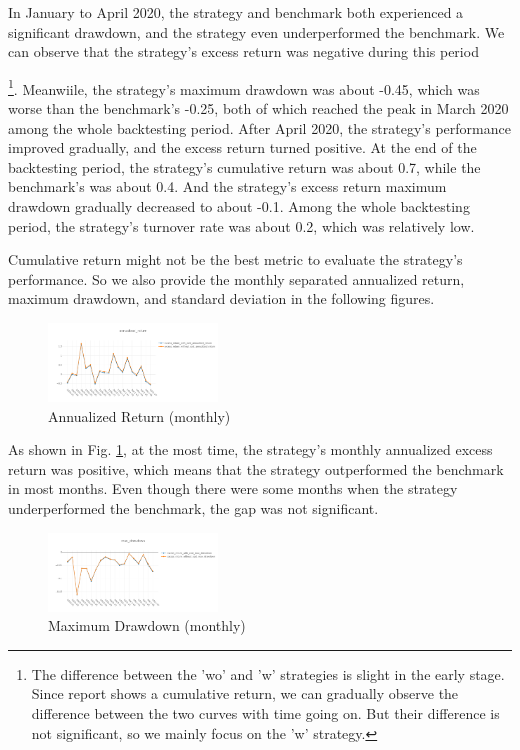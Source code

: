 \documentclass[conference]{IEEEtran}
\begin{document}
In January to April 2020, the strategy and benchmark both experienced a significant drawdown, and the strategy even underperformed the benchmark.
We can observe that the strategy's excess return was negative during this period
{\footnote{
\footnotesize{The difference between the 'wo' and 'w' strategies is slight in the early stage. 
Since report shows a cumulative return, we can gradually observe the difference between the two curves with time going on.
But their difference is not significant, so we mainly focus on the 'w' strategy.}
}.
Meanwiile, the strategy's maximum drawdown was about -0.45, which was worse than the benchmark's -0.25, both of which reached the peak in March 2020 among the whole backtesting period.
After April 2020, the strategy's performance improved gradually, and the excess return turned positive.
At the end of the backtesting period, the strategy's cumulative return was about 0.7, while the benchmark's was about 0.4.
And the strategy's excess return maximum drawdown gradually decreased to about -0.1.
Among the whole backtesting period, the strategy's turnover rate was about 0.2, which was relatively low.

Cumulative return might not be the best metric to evaluate the strategy's performance. 
So we also provide the monthly separated annualized return, maximum drawdown, and standard deviation in the following figures.

\begin{figure}[htbp]
\centering
    \includegraphics[width=0.4\textwidth]{annualized_return.png}
    \caption{Annualized Return (monthly)}
    \label{fig:annualized return (monthly)}
\end{figure}

As shown in Fig. \ref{fig:annualized return (monthly)}, at the most time, the strategy's monthly annualized excess return was positive, which means that the strategy outperformed the benchmark in most months.
Even though there were some months when the strategy underperformed the benchmark, the gap was not significant.

\begin{figure}[htbp]
\centering
    \includegraphics[width=0.4\textwidth]{max_drawdown.png}
    \caption{Maximum Drawdown (monthly)}
    \label{fig:maximum drawdown (monthly)}
\end{figure}

}
\end{document}
